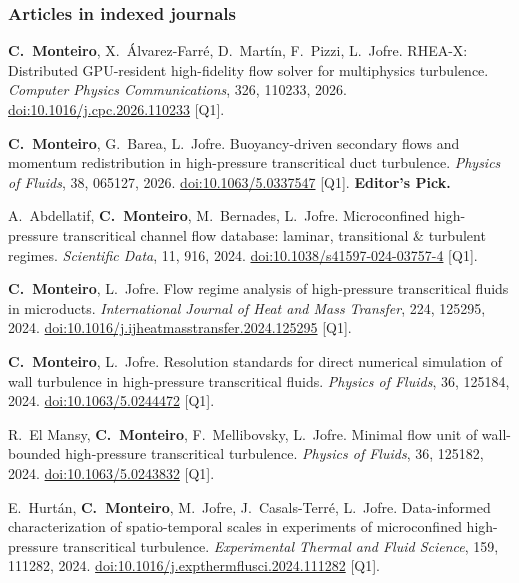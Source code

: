 \documentclass[11pt]{article}
\begin{document}
\subsubsection*{Articles in indexed journals}
\begin{enumerate}[label={[J\arabic*]}, itemsep=0pt]
  \item \hypertarget{pub-J1}{}\textbf{C.\ Monteiro}, X.\ \'Alvarez-Farr\'e, D.\ Mart\'in, F.\ Pizzi, L.\ Jofre.
  RHEA-X: Distributed GPU-resident high-fidelity flow solver for multiphysics turbulence.
  \emph{Computer Physics Communications}, 326, 110233, 2026.
  \href{https://doi.org/10.1016/j.cpc.2026.110233}{doi:10.1016/j.cpc.2026.110233} [Q1].
  \item \hypertarget{pub-J2}{}\textbf{C.\ Monteiro}, G.\ Barea, L.\ Jofre. Buoyancy-driven secondary flows and
  momentum redistribution in high-pressure transcritical duct turbulence.
  \emph{Physics of Fluids}, 38, 065127, 2026.
  \href{https://doi.org/10.1063/5.0337547}{doi:10.1063/5.0337547} [Q1]. \textbf{Editor's Pick.}
  \item \hypertarget{pub-J3}{}A.\ Abdellatif, \textbf{C.\ Monteiro}, M.\ Bernades, L.\ Jofre. Microconfined
  high-pressure transcritical channel flow database: laminar, transitional \& turbulent
  regimes. \emph{Scientific Data}, 11, 916, 2024.
  \href{https://doi.org/10.1038/s41597-024-03757-4}{doi:10.1038/s41597-024-03757-4} [Q1].
  \item \hypertarget{pub-J4}{}\textbf{C.\ Monteiro}, L.\ Jofre. Flow regime analysis of high-pressure
  transcritical fluids in microducts. \emph{International Journal of Heat and Mass
  Transfer}, 224, 125295, 2024.
  \href{https://doi.org/10.1016/j.ijheatmasstransfer.2024.125295}{doi:10.1016/j.ijheatmasstransfer.2024.125295} [Q1].
  \item \hypertarget{pub-J5}{}\textbf{C.\ Monteiro}, L.\ Jofre. Resolution standards for direct numerical
  simulation of wall turbulence in high-pressure transcritical fluids. \emph{Physics of
  Fluids}, 36, 125184, 2024.
  \href{https://doi.org/10.1063/5.0244472}{doi:10.1063/5.0244472} [Q1].
  \item \hypertarget{pub-J6}{}R.\ El Mansy, \textbf{C.\ Monteiro}, F.\ Mellibovsky, L.\ Jofre. Minimal flow unit
  of wall-bounded high-pressure transcritical turbulence. \emph{Physics of Fluids},
  36, 125182, 2024.
  \href{https://doi.org/10.1063/5.0243832}{doi:10.1063/5.0243832} [Q1].
  \item \hypertarget{pub-J7}{}E.\ Hurt\'an, \textbf{C.\ Monteiro}, M.\ Jofre, J.\ Casals-Terr\'e, L.\ Jofre.
  Data-informed characterization of spatio-temporal scales in experiments of microconfined
  high-pressure transcritical turbulence. \emph{Experimental Thermal and Fluid Science},
  159, 111282, 2024.
  \href{https://doi.org/10.1016/j.expthermflusci.2024.111282}{doi:10.1016/j.expthermflusci.2024.111282} [Q1].
\end{enumerate}
\end{document}

